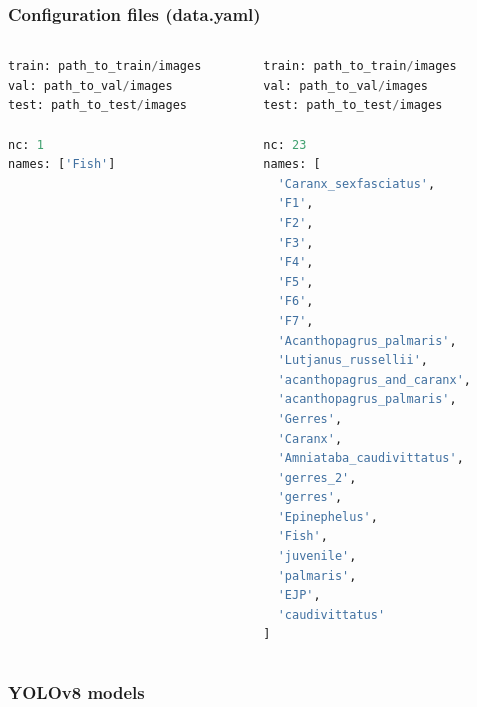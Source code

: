 \documentclass[serif]{beamer}  %
\begin{document}
\begin{frame}[fragile]
\frametitle{Configuration files (data.yaml)}
\begin{columns}
\begin{column}{0.45\textwidth}
\begin{lstlisting}[language=python]
train: path_to_train/images
val: path_to_val/images
test: path_to_test/images

nc: 1
names: ['Fish']
\end{lstlisting}
\end{column}

\begin{column}{0.45\textwidth}
\begin{lstlisting}[language=python]
train: path_to_train/images
val: path_to_val/images
test: path_to_test/images

nc: 23
names: [
  'Caranx_sexfasciatus',
  'F1', 
  'F2',
  'F3', 
  'F4',
  'F5',
  'F6',
  'F7',
  'Acanthopagrus_palmaris',
  'Lutjanus_russellii',
  'acanthopagrus_and_caranx',
  'acanthopagrus_palmaris', 
  'Gerres',
  'Caranx',
  'Amniataba_caudivittatus',
  'gerres_2',
  'gerres',
  'Epinephelus',
  'Fish',
  'juvenile',
  'palmaris',
  'EJP',
  'caudivittatus'
]
\end{lstlisting}
\end{column}
\end{columns}
\end{frame}

\begin{frame}
\frametitle{YOLOv8 models}
\begin{center}
\end{center}
\end{frame}
\end{document}
